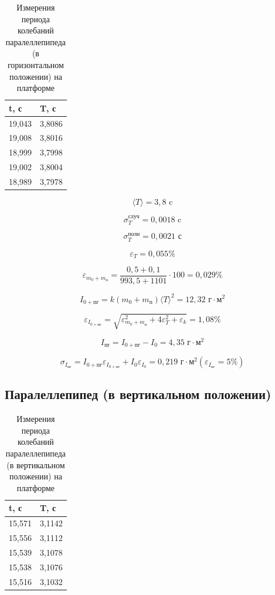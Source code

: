 \documentclass[a4paper, 12pt]{article}
\begin{document}
\begin{table}
    \centering
    \begin{tabular}{|l|l|}
    \hline
        t, с & T, с \\ \hline
        19,043 & 3,8086 \\ \hline
        19,008 & 3,8016 \\ \hline
        18,999 & 3,7998 \\ \hline
        19,002 & 3,8004 \\ \hline
        18,989 & 3,7978 \\ \hline
    \end{tabular}
    \caption{Измерения периода колебаний паралеллепипеда (в горизонтальном положении) на платформе}
\end{table}

\[ \langle T \rangle = 3,8 \text{ c}\]

\[\sigma_T^{\text{случ}} = 0,0018 \text{ c}\]

\[\sigma_T^{\text{полн}} = 0,0021 \text{ с}\]

\[\varepsilon_T = 0,055\% \]

\[\varepsilon_{m_0+m_\text{п}} = \frac{0,5+0,1}{993,5+1101} \cdot 100 = 0,029\%\]

\[ I_{0+\text{пг}} = k(m_0+m_\text{п}) {\langle T \rangle}^2 = 12,32 \text{ г}\cdot\text{м}^2\]

\[ \varepsilon_{I_{0+\text{пг}}} = \sqrt{\varepsilon_{m_0+m_\text{п}}^2 + 4\varepsilon_T^2 + \varepsilon_k} = 1,08\%\]

\[ I_\text{пг} = I_{0+\text{пг}} - I_0 = 4,35 \text{ г}\cdot\text{м}^2\]

\[ \sigma_{I_\text{пг}} = I_{0+\text{пг}}\varepsilon_{I_{0+\text{пг}}} + I_0\varepsilon_{I_0} = 0,219 \text{ г}\cdot\text{м}^2 (\varepsilon_{I_\text{пг}} = 5\%) \]

\subsection*{Паралеллепипед (в вертикальном положении)}

\begin{table}
    \centering
    \begin{tabular}{|l|l|}
    \hline
        t, с & T, с \\ \hline
        15,571 & 3,1142 \\ \hline
        15,556 & 3,1112 \\ \hline
        15,539 & 3,1078 \\ \hline
        15,538 & 3,1076 \\ \hline
        15,516 & 3,1032 \\ \hline
    \end{tabular}
    \caption{Измерения периода колебаний паралеллепипеда (в вертикальном положении) на платформе}
\end{table}
\end{document}
